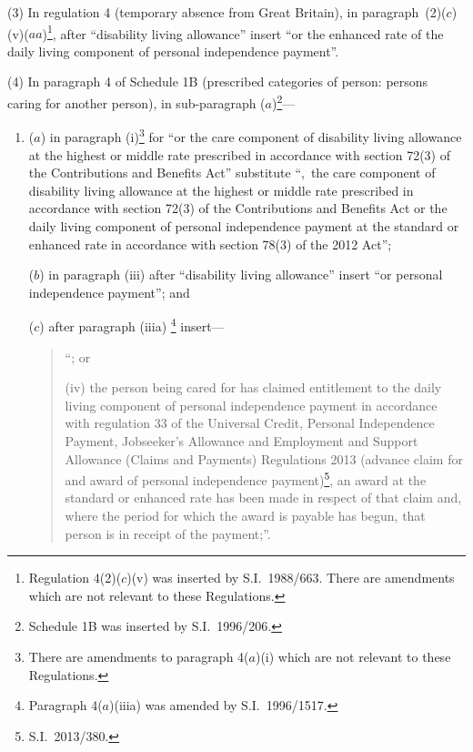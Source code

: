 \documentclass[12pt,a4paper]{article}
\begin{document}
\begin{sloppypar}
(3) In regulation 4 (temporary absence from Great Britain), in paragraph~(2)($c$)(v)($aa$)\footnote{Regulation 4(2)($c$)(v)  was inserted by S.I.~1988/663. There are amendments which are not relevant to these Regulations.}, after “disability living allowance” insert “or the enhanced rate of the daily living component of personal independence payment”.
\end{sloppypar}

(4) In paragraph 4 of Schedule 1B (prescribed categories of person: persons caring for another person), in sub-paragraph ($a$)\footnote{Schedule 1B was inserted by S.I.~1996/206.}—
\begin{enumerate}\item[]
($a$) in paragraph (i)\footnote{There are amendments to paragraph 4($a$)(i)  which are not relevant to these Regulations.} for “or the care component of disability living allowance at the highest or middle rate prescribed in accordance with section 72(3) of the Contributions and Benefits Act” substitute “,~the care component of disability living allowance at the highest or middle rate prescribed in accordance with section 72(3) of the Contributions and Benefits Act or the daily living component of personal independence payment at the standard or enhanced rate in accordance with section 78(3) of the 2012 Act”;

($b$) in paragraph (iii)  after “disability living allowance” insert “or personal independence payment”; and

($c$) after paragraph (iiia) \footnote{Paragraph 4($a$)(iiia)  was amended by S.I.~1996/1517.} insert—
\begin{quotation}
“; or

(iv) the person being cared for has claimed entitlement to the daily living component of personal independence payment in accordance with regulation 33 of the Universal Credit, Personal Independence Payment, Jobseeker’s Allowance and Employment and Support Allowance (Claims and Payments) Regulations 2013 (advance claim for and award of personal independence payment)\footnote{S.I.~2013/380.}, an award at the standard or enhanced rate has been made in respect of that claim and, where the period for which the award is payable has begun, that person is in receipt of the payment;”.
\end{quotation}
\end{enumerate}
\end{document}
